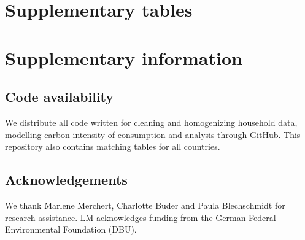 \documentclass[12pt, a4paper]{article}
\begin{document}
\clearpage

\section{Supplementary tables} \label{sec:tables}


\clearpage


\clearpage


\clearpage


\clearpage


\clearpage


\clearpage


\clearpage

%   



\clearpage


\clearpage


\clearpage


\clearpage


\clearpage


\clearpage

\section{Supplementary information}
\subsection{Code availability} \label{code}
We distribute all code written for cleaning and homogenizing household data, modelling carbon intensity of consumption and analysis through \href{https://github.com/lmissbach/Carbon-Intensity-2023}{GitHub}. This repository also contains matching tables for all countries.

\subsection{Acknowledgements} \label{acknowledgements}

We thank Marlene Merchert, Charlotte Buder and Paula Blechschmidt for research assistance. LM acknowledges funding from the German Federal Environmental Foundation (DBU).
\end{document}

